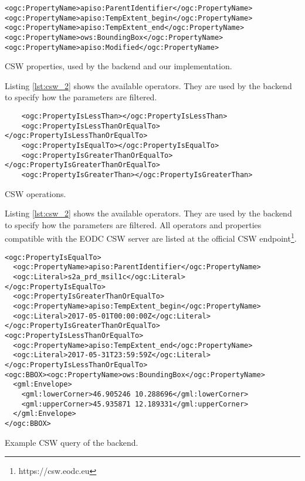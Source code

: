 \documentclass[draft,final]{vutinfth} %
\newenvironment{code}{\captionsetup{type=listing}}{}
\newcommand{\bgoesswein}[1]{#1}
\begin{document}
\begin{code}
	\begin{verbatim}
<ogc:PropertyName>apiso:ParentIdentifier</ogc:PropertyName>
<ogc:PropertyName>apiso:TempExtent_begin</ogc:PropertyName>
<ogc:PropertyName>apiso:TempExtent_end</ogc:PropertyName>
<ogc:PropertyName>ows:BoundingBox</ogc:PropertyName>
<ogc:PropertyName>apiso:Modified</ogc:PropertyName>
	\end{verbatim}
	\caption{CSW properties, used by the backend and our implementation.}
	\label{lst:csw_1}
\end{code} 
\bgoesswein{
Listing \ref{lst:csw_2} shows the available operators. They are used by the backend to specify how the parameters are filtered. 
 }
\begin{code}
	\begin{verbatim}
	<ogc:PropertyIsLessThan></ogc:PropertyIsLessThan>
	<ogc:PropertyIsLessThanOrEqualTo></ogc:PropertyIsLessThanOrEqualTo>
	<ogc:PropertyIsEqualTo></ogc:PropertyIsEqualTo>
	<ogc:PropertyIsGreaterThanOrEqualTo></ogc:PropertyIsGreaterThanOrEqualTo>
	<ogc:PropertyIsGreaterThan></ogc:PropertyIsGreaterThan>
	\end{verbatim}
	\caption{CSW operations.}
	\label{lst:csw_2}
\end{code}  
\bgoesswein{
	Listing \ref{lst:csw_2} shows the available operators. They are used by the backend to specify how the parameters are filtered. All operators and properties compatible with the EODC CSW server are listed at the official CSW endpoint\footnote{https://csw.eodc.eu}. 
}
\newpage
\begin{code}
	\begin{verbatim}
<ogc:PropertyIsEqualTo>
  <ogc:PropertyName>apiso:ParentIdentifier</ogc:PropertyName>
  <ogc:Literal>s2a_prd_msil1c</ogc:Literal>
</ogc:PropertyIsEqualTo>
  <ogc:PropertyIsGreaterThanOrEqualTo>
  <ogc:PropertyName>apiso:TempExtent_begin</ogc:PropertyName>
  <ogc:Literal>2017-05-01T00:00:00Z</ogc:Literal>
</ogc:PropertyIsGreaterThanOrEqualTo>
<ogc:PropertyIsLessThanOrEqualTo>
  <ogc:PropertyName>apiso:TempExtent_end</ogc:PropertyName>
  <ogc:Literal>2017-05-31T23:59:59Z</ogc:Literal>
</ogc:PropertyIsLessThanOrEqualTo>
<ogc:BBOX><ogc:PropertyName>ows:BoundingBox</ogc:PropertyName>
  <gml:Envelope>
    <gml:lowerCorner>46.905246 10.288696</gml:lowerCorner>
    <gml:upperCorner>45.935871 12.189331</gml:upperCorner>
  </gml:Envelope>
</ogc:BBOX>
	\end{verbatim}
	\caption{Example CSW query of the backend.}
	\label{lst:csw_3}
\end{code}  
\end{document}

